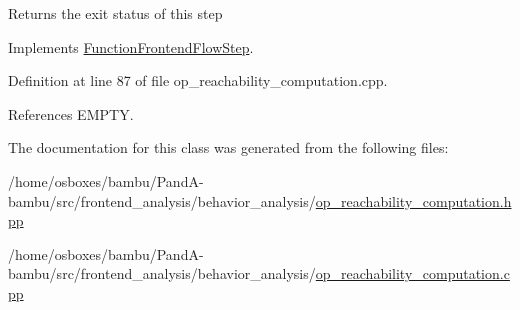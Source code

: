 \begin{DoxyReturn}{Returns}
the exit status of this step 
\end{DoxyReturn}


Implements \hyperlink{classFunctionFrontendFlowStep_a00612f7fb9eabbbc8ee7e39d34e5ac68}{Function\+Frontend\+Flow\+Step}.



Definition at line 87 of file op\+\_\+reachability\+\_\+computation.\+cpp.



References E\+M\+P\+TY.



The documentation for this class was generated from the following files\+:\begin{DoxyCompactItemize}
\item 
/home/osboxes/bambu/\+Pand\+A-\/bambu/src/frontend\+\_\+analysis/behavior\+\_\+analysis/\hyperlink{op__reachability__computation_8hpp}{op\+\_\+reachability\+\_\+computation.\+hpp}\item 
/home/osboxes/bambu/\+Pand\+A-\/bambu/src/frontend\+\_\+analysis/behavior\+\_\+analysis/\hyperlink{op__reachability__computation_8cpp}{op\+\_\+reachability\+\_\+computation.\+cpp}\end{DoxyCompactItemize}
